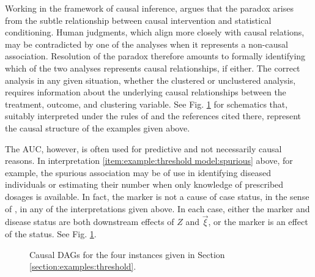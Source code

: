 \documentclass[12pt]{article}
\begin{document}
Working in the framework of causal inference, \cite{pearl2014} argues
that the paradox arises from the subtle relationship between
causal intervention and statistical conditioning. Human judgments, which align more closely with causal relations, may be contradicted by one of the analyses when it represents a non-causal association. Resolution of the paradox therefore amounts to
formally identifying which of the two analyses represents causal relationships, if either. The correct analysis
in any given situation, whether the clustered or unclustered analysis,
requires information about the underlying causal relationships between
the treatment, outcome, and clustering variable. See Fig. \ref{fig:dags} for schematics that, suitably interpreted under the rules of \cite{pearl2014} and the references cited there, represent the causal structure of the examples given above.

The AUC, however, is often used for predictive and not necessarily causal reasons. In interpretation \ref{item:example:threshold model:spurious} above, for example, the spurious association may be of use in identifying diseased individuals or estimating their number when only knowledge of prescribed dosages is available. In fact, the marker is not a cause of case status, in the sense of \cite{pearl2014}, in any of the interpretations given above. In each case, either the marker and disease status are both downstream effects of $Z$ and $\vec{\xi}$, or the marker is an effect of the status. See Fig. \ref{fig:dags}.

\begin{figure}
\caption{Causal DAGs for the four instances given in Section \ref{section:examples:threshold}.}\label{fig:dags}
\end{figure}
\end{document}
